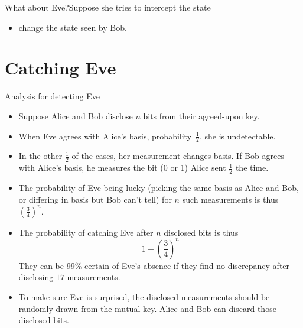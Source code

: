 \begin{frame}{What about Eve?}{Suppose she tries to intercept the state}
{\begin{BBKey}
{\begin{itemize}
\begin{itemize}
\begin{itemize}
            \item<8-> change the state seen by Bob.
        \end{itemize}
    \end{itemize}
\end{itemize}
}
\end{BBKey}
}
\end{frame}

\section*{Catching Eve}

\begin{frame}{Analysis for detecting Eve}
\Vskip{-3em}\begin{itemize}[<+->]
    \item Suppose Alice and Bob disclose $n$ bits from their agreed-upon key.
    \item When Eve agrees with Alice's basis, probability~$\frac{1}{2}$, she is undetectable.
    \item In the other $\frac{1}{2}$ of the cases, her measurement changes basis. If Bob agrees with Alice's basis, he measures the bit (0 or 1) Alice sent $\frac{1}{2}$ the time.
    \item The probability of Eve being lucky (picking the same basis as Alice and Bob, or differing in basis but Bob can't tell) for $n$ such measurements is thus $\left(\frac{3}{4}\right)^{n}$.
    \item The probability of catching Eve after $n$ disclosed bits is thus
    \[ 1 - \left(\frac{3}{4}\right)^{n} \]
    They can be 99\% certain of Eve's absence if they find no discrepancy after disclosing $17$ measurements. 
    \item To make sure Eve is surprised, the disclosed measurements should be randomly drawn from the mutual key.  Alice and Bob can discard those disclosed bits.
\end{itemize}

\end{frame}

